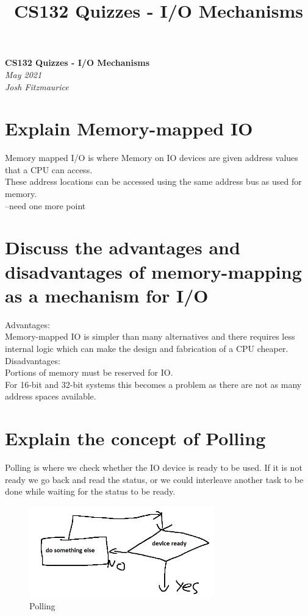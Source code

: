 \documentclass{article}
\title{CS132 Quizzes - I/O Mechanisms}
\begin{document}
\begin{center}
    \Huge\textbf{CS132 Quizzes - I/O Mechanisms}\\
    \huge\textit{May 2021}\\
    \medskip
    \Large\textit{Josh Fitzmaurice}
\end{center}




\section{Explain Memory-mapped IO}
Memory mapped I/O is where Memory on IO devices are given address values that a
CPU can access.\\
These address locations can be accessed using the same address bus as used for
memory.\\
--need one more point

\section{Discuss the advantages and disadvantages of memory-mapping as a mechanism for I/O}
Advantages:\\
Memory-mapped IO is simpler than many alternatives and there requires less
internal logic which can make the design and fabrication of a CPU cheaper.\\
Disadvantages:\\
Portions of memory must be reserved for IO.\\
For 16-bit and 32-bit systems this becomes a problem as there are not as many
address spaces available.

\section{Explain the concept of Polling}
Polling is where we check whether the IO device is ready to be used. If it is
not ready we go back and read the status, or we could interleave another task to
be done while waiting for the status to be ready.\\
\begin{figure}[h]
    \centering
    \includegraphics[width = 80mm]{IO.PNG}
    \caption{Polling}
    \label{fig:my_label}
\end{figure}
\newpage
\end{document}
